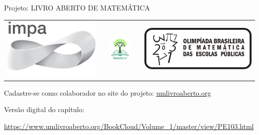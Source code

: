 \begin{center}
Projeto: LIVRO ABERTO DE MATEMÁTICA

\noindent \begin{tabular}{lcccr}
\includegraphics[scale=.15]{impa}& \quad\quad& \includegraphics[width=3cm]{logo} & \quad\quad& \includegraphics[scale=.24]{obmep} 
\end{tabular}
\end{center}

\vspace*{.3cm}

Cadastre-se como colaborador no site do projeto: \url{umlivroaberto.org}

Versão digital do capítulo:

\url{https://www.umlivroaberto.org/BookCloud/Volume_1/master/view/PE103.html}


